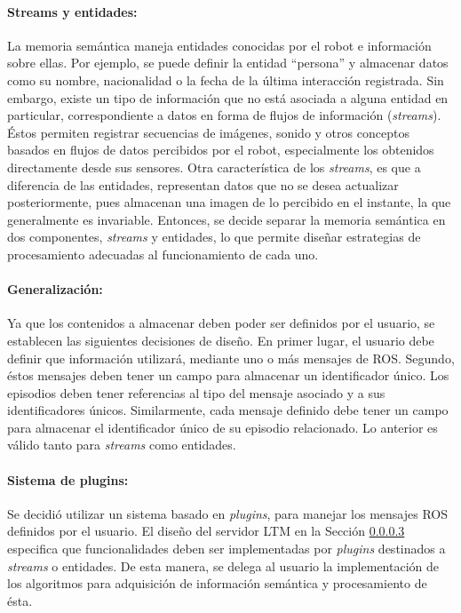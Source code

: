 \paragraph{Streams y entidades:} 
La memoria semántica maneja entidades conocidas por el robot e información sobre ellas. Por ejemplo, se puede definir la entidad ``persona'' y almacenar datos como su nombre, nacionalidad o la fecha de la última interacción registrada. Sin embargo, existe un tipo de información que no está asociada a alguna entidad en particular, correspondiente a datos en forma de flujos de información (\textit{streams}). Éstos permiten registrar secuencias de imágenes, sonido y otros conceptos basados en flujos de datos percibidos por el robot, especialmente los obtenidos directamente desde sus sensores. Otra característica de los \textit{streams}, es que a diferencia de las entidades, representan datos que no se desea actualizar posteriormente, pues almacenan una imagen de lo percibido en el instante, la que generalmente es invariable. Entonces, se decide separar la memoria semántica en dos componentes, \textit{streams} y entidades, lo que permite diseñar estrategias de procesamiento adecuadas al funcionamiento de cada uno.


\paragraph{Generalización:}
Ya que los contenidos a almacenar deben poder ser definidos por el usuario, se establecen las siguientes decisiones de diseño. En primer lugar, el usuario debe definir que información utilizará, mediante uno o más mensajes de ROS. Segundo, éstos mensajes deben tener un campo para almacenar un identificador único. Los episodios deben tener referencias al tipo del mensaje asociado y a sus identificadores únicos. Similarmente, cada mensaje definido debe tener un campo para almacenar el identificador único de su episodio relacionado. Lo anterior es válido tanto para \textit{streams} como entidades.



\paragraph{Sistema de plugins:}
Se decidió utilizar un sistema basado en \textit{plugins}, para manejar los mensajes ROS definidos por el usuario. El diseño del servidor LTM en la Sección \ref{} especifica que funcionalidades deben ser implementadas por \textit{plugins} destinados a \textit{streams} o entidades. De esta manera, se delega al usuario la implementación de los algoritmos para adquisición de información semántica y procesamiento de ésta.


